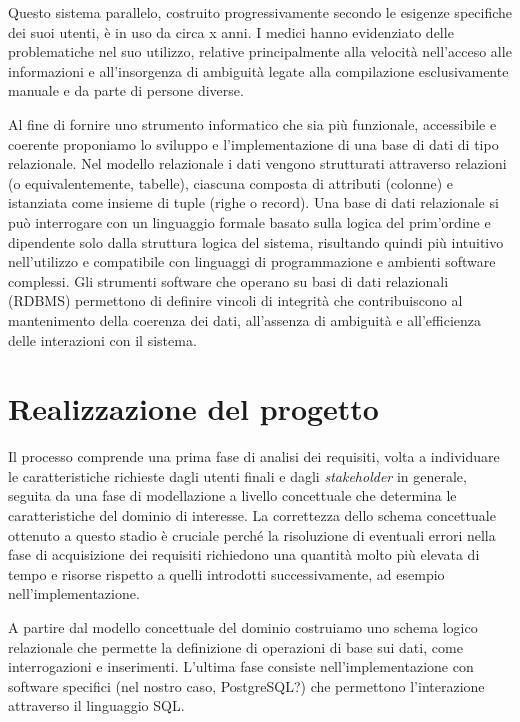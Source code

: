 Questo sistema parallelo, costruito progressivamente secondo le esigenze specifiche dei suoi utenti, è in uso da circa x anni.
I medici hanno evidenziato delle problematiche nel suo utilizzo, relative principalmente alla velocità nell'acceso alle informazioni e all'insorgenza di ambiguità legate alla compilazione esclusivamente manuale e da parte di persone diverse.

Al fine di fornire uno strumento informatico che sia più funzionale, accessibile e coerente proponiamo lo sviluppo e l'implementazione di una base di dati di tipo relazionale.
Nel modello relazionale \cite{Cod70} i dati vengono strutturati attraverso relazioni (o equivalentemente, tabelle), ciascuna composta di attributi (colonne) e istanziata come insieme di tuple (righe o record).
Una base di dati relazionale si può interrogare con un linguaggio formale basato sulla logica del prim'ordine e dipendente solo dalla struttura logica del sistema, risultando quindi più intuitivo nell'utilizzo e compatibile con linguaggi di programmazione e ambienti software complessi.
Gli strumenti software che operano su basi di dati relazionali (RDBMS) permettono di definire vincoli di integrità che contribuiscono al mantenimento della coerenza dei dati, all'assenza di ambiguità e all'efficienza delle interazioni con il sistema.

\section{Realizzazione del progetto}

Il processo comprende una prima fase di analisi dei requisiti, volta a individuare le caratteristiche richieste dagli utenti finali e dagli \emph{stakeholder} in generale, seguita da una fase di modellazione a livello concettuale che determina le caratteristiche del dominio di interesse.
La correttezza dello schema concettuale ottenuto a questo stadio è cruciale perché la risoluzione di eventuali errori nella fase di acquisizione dei requisiti richiedono una quantità molto più elevata di tempo e risorse rispetto a quelli introdotti successivamente, ad esempio nell'implementazione.

A partire dal modello concettuale del dominio costruiamo uno schema logico relazionale che permette la definizione di operazioni di base sui dati, come interrogazioni e inserimenti.
L'ultima fase consiste nell'implementazione con software specifici (nel nostro caso, PostgreSQL?) che permettono l'interazione attraverso il linguaggio SQL.

